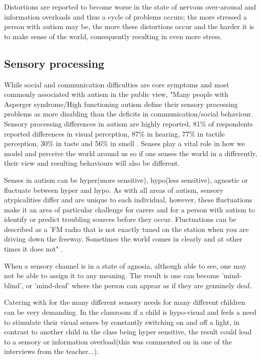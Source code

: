 \documentclass[11pt]{report}
\begin{document}
Distortions are reported to become worse in the state of nervous over-arousal and information overloads\cite{olgab} and thus a cycle of problems occurs; the more stressed a person with autism may be, the more these distortions occur and the harder it is to make sense of the world, consequently resulting in even more stress.

\subsection{Sensory processing}

While social and communication difficulties are core symptoms and most commonly associated with autism in the public view, "Many people with Asperger syndrome/High functioning autism define their sensory processing problems as more disabling than the deficits in communication/social behaviour\cite{olgab}. Sensory processing differences in autism are highly reported, 81\% of respondents reported differences in visual perception, 87\% in hearing, 77\% in tactile perception, 30\% in taste and 56\% in smell \cite{sensory_leisure}. Senses play a vital role in how we model and perceive the world around us so if one senses the world in a differently, their view and resulting behaviours will also be different. 

Senses in autism can be hyper(more sensitive), hypo(less sensitive), agnostic or fluctuate between hyper and hypo\cite{bayes}. As with all areas of autism, sensory atypicalities differ and are unique to each individual, however, these fluctuations make it an area of particular challenge for carers and for a person with autism to identify or predict troubling sources before they occur. Fluctuations can be described as a 'FM radio that is not exactly tuned on the station when you are driving down the freeway. Sometimes the world comes in clearly and at other times it does not" \cite{olgab}.

When a sensory channel is in a state of agnosia, although able to see, one may not be able to assign it to any meaning. The result is one can become 'mind-blind', or 'mind-deaf' where the person can appear as if they are genuinely deaf.

Catering with for the many different sensory needs for many different children can be very demanding. In the classroom if a child is hypo-visual and feels a need to stimulate their visual senses by constantly switching on and off a light, in contrast to another child in the class being hyper sensitive, the result could lead to a sensory or information overload(this was commented on in one of the interviews from the teacher...).
\end{document}
